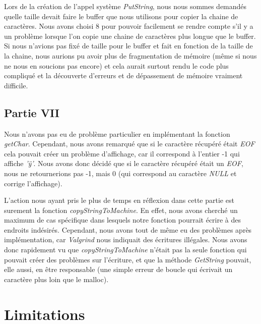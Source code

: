 \documentclass{article}
\begin{document}
    Lors de la création de l'appel système \textit{PutString}, nous nous sommes demandés quelle taille devait faire le buffer que nous utilisons pour copier la chaine de caractères.
Nous avons choisi 8 pour pouvoir facilement se rendre compte s'il y a un problème lorsque l'on copie une chaine de caractères plus longue que le buffer. Si nous
n'avions pas fixé de taille pour le buffer et fait en fonction de la taille de la chaine, nous aurions pu avoir plus de fragmentation de mémoire (même si nous ne nous en soucions pas encore)
et cela aurait surtout rendu le code plus compliqué et la découverte d'erreurs et de dépassement de mémoire vraiment difficile.
\subsection{Partie VII} \label{bugPartieVII}
Nous n'avons pas eu de problème particulier en implémentant la fonction \textit{getChar}. Cependant, nous avons remarqué que si le caractère récupéré
était \textit{EOF} cela pouvait créer un problème d'affichage, car il correspond à l'entier -1 qui affiche \textit{'ÿ'}. Nous avons donc décidé que si
le caractère récupéré était un \textit{EOF}, nous ne retournerions pas -1, mais 0 (qui correspond au caractère \textit{NULL} et corrige l'affichage).

L'action nous ayant pris le plus de temps en réflexion dans cette partie est surement la fonction \textit{copyStringToMachine}.
En effet, nous avons cherché un maximum de cas spécifique dans lesquels notre fonction pourrait écrire à des endroits
indésirés. Cependant, nous avons tout de même eu des problèmes après implémentation, car \textit{Valgrind} nous indiquait des écritures
illégales. Nous avons donc rapidement vu que \textit{copyStringToMachine} n'était pas la seule fonction qui pouvait créer des problèmes
sur l'écriture, et que la méthode \textit{GetString} pouvait, elle aussi, en être responsable (une simple erreur de boucle qui écrivait un caractère plus loin que le malloc).


\section{Limitations}
\end{document}
